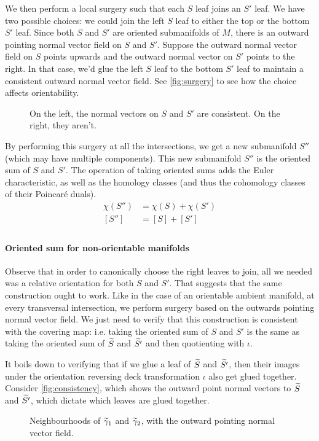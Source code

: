 We then perform a local surgery such that each $S$ leaf joins an $S'$ leaf. We have two possible
choices: we could join the left $S$ leaf to either the top or the bottom $S'$ leaf. Since both $S$
and $S'$ are oriented submanifolds of $M$, there is an outward pointing normal vector field on $S$
and $S'$. Suppose the outward normal vector field on $S$ points upwards and the outward normal
vector on $S'$ points to the right. In that case, we'd glue the left $S$ leaf to the bottom $S'$
leaf to maintain a consistent outward normal vector field. See \autoref{fig:surgery} to see how the
choice affects orientability.
\begin{figure}[h]
  \centering
  \caption{On the left, the normal vectors on $S$ and $S'$ are consistent. On the right, they aren't.}
  \label{fig:surgery}
\end{figure}

By performing this surgery at all the intersections, we get a new submanifold $S''$ (which may have
multiple components). This new submanifold $S''$ is the oriented sum of $S$ and $S'$. The operation
of taking oriented sums adds the Euler characteristic, as well as the homology classes (and thus
the cohomology classes of their Poincar\'e duals).
\begin{align*}
  \chi(S'') &= \chi(S) + \chi(S') \\
  [S''] &= [S] + [S'] \\
\end{align*}

\paragraph{Oriented sum for non-orientable manifolds}
Observe that in order to canonically choose the right leaves to join, all we needed was a relative
orientation for both $S$ and $S'$. That suggests that the same construction ought to work. Like in the case of an orientable ambient manifold, at every transversal intersection, we perform surgery
based on the outwards pointing normal vector field.
We just need to verify that this construction is consistent with the covering map: i.e. taking
the oriented sum of $S$ and $S'$ is the same as taking the oriented sum of $\widetilde{S}$ and $\widetilde{S'}$
and then quotienting with $\iota$.

It boils down to verifying that if we glue a leaf of $\widetilde{S}$ and $\widetilde{S'}$, then their images
under the orientation reversing deck transformation $\iota$ also get glued together. Consider
\autoref{fig:consistency}, which shows the outward point normal vectors to $\widetilde{S}$ and $\widetilde{S'}$,
which dictate which leaves are glued together.
\begin{figure}[h]
  \centering
  \caption{Neighbourhoods of $\widetilde{\gamma}_1$ and $\widetilde{\gamma}_2$, with the outward pointing normal vector field.}
  \label{fig:consistency}
\end{figure}

